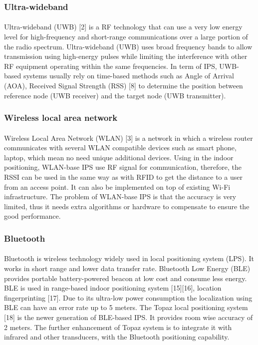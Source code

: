 \subsubsection{Ultra-wideband}
\paragraph{} Ultra-wideband (UWB) [2] is a RF technology that can use a very low energy level for high-frequency and short-range communications over a large portion of the radio spectrum. Ultra-wideband (UWB) uses broad frequency bands to allow transmission using high-energy pulses while limiting the interference with other RF equipment operating within the same frequencies. In term of IPS, UWB-based systems usually rely on time-based methods such as Angle of Arrival (AOA), Received Signal Strength (RSS) [8] to determine the position between reference node (UWB receiver) and the target node (UWB transmitter).

\subsubsection{Wireless local area network}
\paragraph{} Wireless Local Area Network (WLAN) [3] is a network in which a wireless
router communicates with several WLAN compatible devices such as smart phone, laptop, which mean no need unique additional devices. Using in the indoor positioning, WLAN-base IPS use RF signal for communication, therefore, the RSSI can be used in the same way as with RFID to get the distance to a user from an access point. It can also be implemented on top of existing Wi-Fi infrastructure. The problem of WLAN-base IPS is that the accuracy is very limited, thus it needs extra algorithms or hardware to compensate to ensure the good performance.


\subsubsection{Bluetooth}
\paragraph{} Bluetooth is wireless technology widely used in local positioning system (LPS). It works in short range and lower data transfer rate. Bluetooth Low Energy (BLE) provides portable battery-powered beacon at low cost and consume less energy. BLE is used in range-based indoor positioning system [15][16], location fingerprinting [17]. Due to its ultra-low power consumption the localization using BLE can have an error rate up to 5 meters. The Topaz local positioning system [18] is the newer generation of BLE-based IPS. It provides room wise accuracy of 2 meters. The further enhancement of Topaz system is to integrate it with infrared and other transducers, with the Bluetooth positioning capability.

